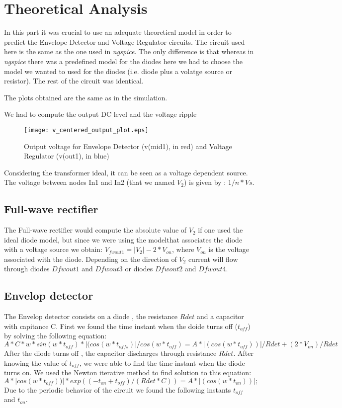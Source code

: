 \section{Theoretical Analysis}
\label{sec:analysis}



In this part it was crucial to use an adequate theoretical model in order to predict the Envelope Detector and Voltage Regulator circuits. The circuit used here is the same as the one used in \textit{ngspice}. The only difference is that whereas in \textit{ngspice} there was a predefined model for the diodes here we had to choose the model we wanted to used for the diodes (i.e. diode plus a volatge source or resistor). The rest of the circuit was identical.

The plots obtained are the same as in the simulation.

We had to compute the output DC level and the voltage ripple


\begin{figure}[H] \centering
\texttt{[image: v\_centered\_output\_plot.eps]}
\caption{Output voltage for Envelope Detector (v(mid1), in red) and Voltage Regulator (v(out1), in blue)}
\label{fig:phase_sim}
\end{figure}

Considering the transformer ideal, it can be seen as a voltage dependent source. The voltage between nodes In1 and In2 (that we named $V_2$) is given by : $1/n * Vs$.

\subsection{Full-wave rectifier}
The Full-wave rectifier would  compute the  absolute value of $V_2$ if one used the ideal diode model, but since we were using the modelthat associates the diode with a voltage source we obtain: $V_{fwout1} = |V_2|- 2*V_{on}$, where $V_{on}$ is the voltage associated with the diode. Depending on the direction of $V_2$ current will flow through diodes $Dfwout1$ and $Dfwout3$ or diodes $Dfwout2$ and $Dfwout4$.

\subsection{Envelop detector}
The Envelop detector consists on a diode , the resistance $Rdet$ and a capacitor with capitance C. First we found the time instant when the doide turns off ($t_{off}$) by solving the following equation:
\begin{equation}
  A*C*w*sin(w*t_{off})*|(cos(w*t_{offs})|/cos(w*t_{off}) =  A*|(cos(w*t_{off}))|/Rdet +(2*V_{on})/Rdet
\end{equation}
After the diode turns off , the capacitor discharges through resistance $Rdet$.
After knowing the value of $t_{off}$, we were able to find the time instant when  the diode turns on. We used the Newton iterative method to find solution to this equation:
\begin{equation}
   A*|cos(w*t_{off}))|*exp((-t_{on}+t_{off})/(Rdet*C))=  A*|(cos(w*t_{on}))|;
\end{equation}
Due to the periodic behavior of the circuit we found the following instants $t_{off}$ and $t_{on}$.  
